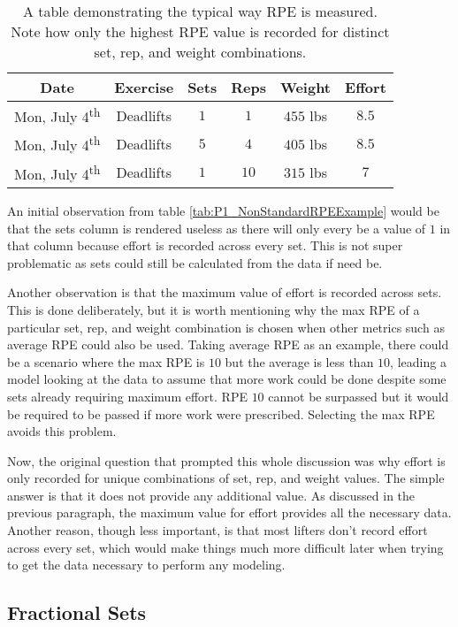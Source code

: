 \begin{table}[h]
	\centering
	\begin{tabular}{c|c|c|c|c|c}
		Date & Exercise & Sets & Reps & Weight & Effort \\
        \hline
        Mon, July 4\textsuperscript{th} & Deadlifts & $1$ & $1$ & $455$ lbs & $8.5$ \\
        Mon, July 4\textsuperscript{th} & Deadlifts & $5$ & $4$ & $405$ lbs & $8.5$ \\
        Mon, July 4\textsuperscript{th} & Deadlifts & $1$ & $10$ & $315$ lbs & $7$ \\
	\end{tabular}
	\caption{A table demonstrating the typical way RPE is measured. Note how only the highest RPE value is recorded for distinct set, rep, and weight combinations.}
	\label{tab:P1_StandardRPEExample}
\end{table}

An initial observation from table \ref{tab:P1_NonStandardRPEExample} would be that the sets column is rendered useless as there will only every be a value of $1$ in that column because effort is recorded across every set. This is not super problematic as sets could still be calculated from the data if need be. 

Another observation is that the maximum value of effort is recorded across sets. This is done deliberately, but it is worth mentioning why the max RPE of a particular set, rep, and weight combination is chosen when other metrics such as average RPE could also be used. Taking average RPE as an example, there could be a scenario where the max RPE is $10$ but the average is less than $10$, leading a model looking at the data to assume that more work could be done despite some sets already requiring maximum effort. RPE $10$ cannot be surpassed but it would be required to be passed if more work were prescribed. Selecting the max RPE avoids this problem.

Now, the original question that prompted this whole discussion was why effort is only recorded for unique combinations of set, rep, and weight values. The simple answer is that it does not provide any additional value. As discussed in the previous paragraph, the maximum value for effort provides all the necessary data. Another reason, though less important, is that most lifters don't record effort across every set, which would make things much more difficult later when trying to get the data necessary to perform any modeling.


\subsection{Fractional Sets}
\label{sec:P1_FractionalSets}

